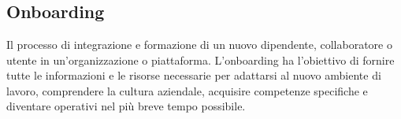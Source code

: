 \newpage



\section{}

\hypertarget{sec:onboarding}{}
\subsection*{Onboarding}
Il processo di integrazione e formazione di un nuovo dipendente, collaboratore o utente in un'organizzazione o piattaforma. L'onboarding ha l'obiettivo di 
fornire tutte le informazioni e le risorse necessarie per adattarsi al nuovo ambiente di lavoro, comprendere la cultura aziendale, acquisire competenze 
specifiche e diventare operativi nel più breve tempo possibile. 


\newpage